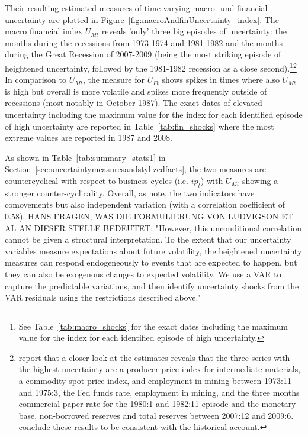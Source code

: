 \documentclass[a4paper,11pt,listof=nochaptergap,oneside,pointednumbers,bibtotoc,bigheadings,liststotoc]{scrbook}
\theoremstyle{mysatz}
\theoremstyle{mydefinition}
\theoremstyle{mytheorem}
\theoremstyle{mybemerkung}
\begin{document}
Their resulting estimated measures of time-varying macro- und financial uncertainty are plotted in Figure~\ref{fig:macroAndfinUncertainty_index}. The macro financial index $U_{Mt}$ reveals 'only' three big episodes of uncertainty: the months during the recessions from 1973-1974 and 1981-1982 and the months during the Great Recession of 2007-2009 (being the most striking episode of heightened uncertainty, followed by the 1981-1982 recession as a close second).\footnote{See Table~\ref{tab:macro_shocks} for the exact dates including the maximum value for the index for each identified episode of high uncertainty.}\footnote{\citet{juradoetal:15} report that a closer look at the estimates reveals that the three series with the highest uncertainty are a producer price index for intermediate materials, a commodity spot price index, and employment in mining between 1973:11 and 1975:3, the Fed funds rate, employment in mining, and the three months commercial paper rate for the 1980:1 and 1982:11 episode and the monetary base, non-borrowed reserves and total reserves between 2007:12 and 2009:6. \citet{juradoetal:15} conclude these results to be consistent with the historical account.} In comparison to $U_{Mt}$, the measure for $U_{Ft}$ shows spikes in times where also $U_{Mt}$ is high but overall is more volatile and spikes more frequently outside of recessions (most notably in October 1987). The exact dates of elevated uncertainty including the maximum value for the index for each identified episode of high uncertainty are reported in Table~\ref{tab:fin_shocks} where the most extreme values are reported in 1987 and 2008.

As shown in Table~\ref{tab:summary_stats1} in Section~\ref{sec:uncertaintymeasuresandstylizedfacts}, the two measures are countercyclical with respect to business cycles (i.e. $ip_t$) with $U_{Mt}$ showing a stronger counter-cyclicality. Overall, as \citet{ludvigsonetal:18} note, the two indicators have comovements but also independent variation (with a correlation coefficient of 0.58). HANS FRAGEN, WAS DIE FORMULIERUNG VON LUDVIGSON ET AL AN DIESER STELLE BEDEUTET: "However, this unconditional correlation cannot be given a structural interpretation. To the extent that our uncertainty variables measure expectations about future volatility, the heightened uncertainty measures can respond endogeneously to events that are expected to happen, but they can also be exogenous changes to expected volatility. We use a VAR to capture the predictable variations, and then identify uncertainty shocks from the VAR residuals using the restrictions described above."
\end{document}
